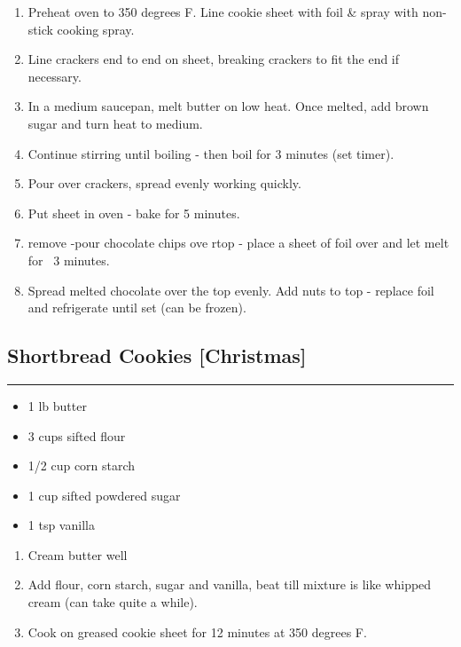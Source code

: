 \documentclass{article}
\begin{document}
\begin{enumerate}
    \item 
        Preheat oven to 350 degrees F. Line cookie sheet with foil \& spray with non-stick cooking spray.
    \item 
        Line crackers end to end on sheet, breaking crackers to fit the end if necessary.
    \item 
        In a medium saucepan, melt butter on low heat. Once melted, add brown sugar and turn heat to medium.
    \item 
        Continue stirring until boiling - then boil for 3 minutes (set timer).
    \item 
        Pour over crackers, spread evenly working quickly. 
    \item 
        Put sheet in oven - bake for 5 minutes.
    \item 
        remove -pour chocolate chips ove rtop - place a sheet of foil over and let melt for ~3 minutes.
    \item 
        Spread melted chocolate over the top evenly. Add nuts to top - replace foil and refrigerate until set (can be frozen).
\end{enumerate}
\newpage

\subsection{Shortbread Cookies [Christmas]} 
\noindent\rule[0.5ex]{\linewidth}{1pt}

\begin{framed}
\begin{itemize}
    \item 1 lb butter
    \item 3 cups sifted flour
    \item 1/2 cup corn starch
    \item 1 cup sifted powdered sugar
    \item 1 tsp vanilla
\end{itemize}
\end{framed}

\begin{enumerate}
    \item 
        Cream butter well
    \item
        Add flour, corn starch, sugar and vanilla, beat till mixture is like whipped cream (can take quite a while).
    \item 
        Cook on greased cookie sheet for 12 minutes at 350 degrees F.
\end{enumerate}
\newpage
\end{document}
